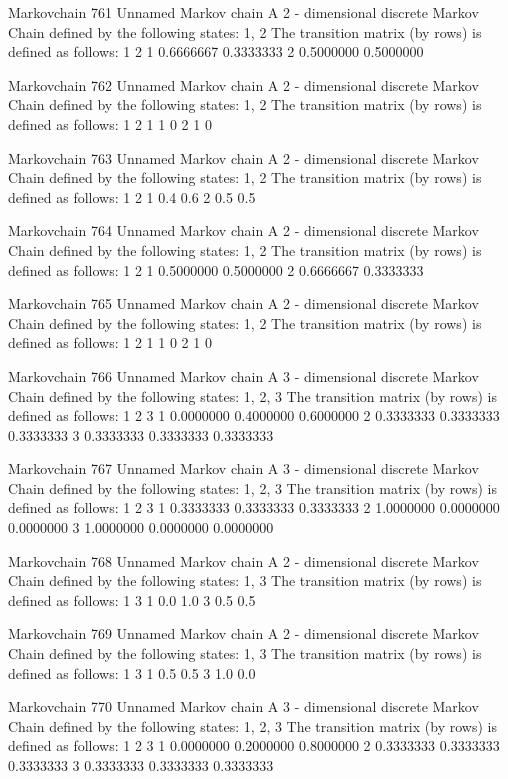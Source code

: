 \documentclass[
  nojss]{jss}
\begin{document}
\begin{CodeChunk}
\begin{CodeOutput}
Markovchain  761 
Unnamed Markov chain 
 A  2 - dimensional discrete Markov Chain defined by the following states: 
 1, 2 
 The transition matrix  (by rows)  is defined as follows: 
          1         2
1 0.6666667 0.3333333
2 0.5000000 0.5000000

Markovchain  762 
Unnamed Markov chain 
 A  2 - dimensional discrete Markov Chain defined by the following states: 
 1, 2 
 The transition matrix  (by rows)  is defined as follows: 
  1 2
1 1 0
2 1 0

Markovchain  763 
Unnamed Markov chain 
 A  2 - dimensional discrete Markov Chain defined by the following states: 
 1, 2 
 The transition matrix  (by rows)  is defined as follows: 
    1   2
1 0.4 0.6
2 0.5 0.5

Markovchain  764 
Unnamed Markov chain 
 A  2 - dimensional discrete Markov Chain defined by the following states: 
 1, 2 
 The transition matrix  (by rows)  is defined as follows: 
          1         2
1 0.5000000 0.5000000
2 0.6666667 0.3333333

Markovchain  765 
Unnamed Markov chain 
 A  2 - dimensional discrete Markov Chain defined by the following states: 
 1, 2 
 The transition matrix  (by rows)  is defined as follows: 
  1 2
1 1 0
2 1 0

Markovchain  766 
Unnamed Markov chain 
 A  3 - dimensional discrete Markov Chain defined by the following states: 
 1, 2, 3 
 The transition matrix  (by rows)  is defined as follows: 
          1         2         3
1 0.0000000 0.4000000 0.6000000
2 0.3333333 0.3333333 0.3333333
3 0.3333333 0.3333333 0.3333333

Markovchain  767 
Unnamed Markov chain 
 A  3 - dimensional discrete Markov Chain defined by the following states: 
 1, 2, 3 
 The transition matrix  (by rows)  is defined as follows: 
          1         2         3
1 0.3333333 0.3333333 0.3333333
2 1.0000000 0.0000000 0.0000000
3 1.0000000 0.0000000 0.0000000

Markovchain  768 
Unnamed Markov chain 
 A  2 - dimensional discrete Markov Chain defined by the following states: 
 1, 3 
 The transition matrix  (by rows)  is defined as follows: 
    1   3
1 0.0 1.0
3 0.5 0.5

Markovchain  769 
Unnamed Markov chain 
 A  2 - dimensional discrete Markov Chain defined by the following states: 
 1, 3 
 The transition matrix  (by rows)  is defined as follows: 
    1   3
1 0.5 0.5
3 1.0 0.0

Markovchain  770 
Unnamed Markov chain 
 A  3 - dimensional discrete Markov Chain defined by the following states: 
 1, 2, 3 
 The transition matrix  (by rows)  is defined as follows: 
          1         2         3
1 0.0000000 0.2000000 0.8000000
2 0.3333333 0.3333333 0.3333333
3 0.3333333 0.3333333 0.3333333


\end{CodeOutput}
\end{CodeChunk}
\end{document}
